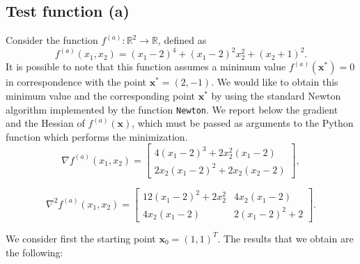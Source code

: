 \documentclass[a4paper,11pt]{article}
\newcommand{\R}{\mathbb{R}}
\begin{document}
	
	\subsection*{Test function (a)}
	Consider the function $f^{(a)}: \R^{2}\rightarrow \R$, defined as
	\begin{equation}
		f^{(a)}(x_{1},x_{2}) = (x_{1}-2)^{4} + (x_{1}-2)^{2}x_{2}^{2} + (x_{2}+1)^{2}.
	\end{equation}
	It is possible to note that this function assumes a minimum value $f^{(a)}(\textbf{x}^*)=0$ in correspondence with the point $\textbf{x}^*=(2,-1)$. We would like to obtain this minimum value and the corresponding point $\textbf{x}^*$ by using the standard Newton algorithm implemented by the function \texttt{Newton}. We report below the gradient and the Hessian of $f^{(a)}(\textbf{x})$, which must be passed as arguments to the Python function which performs the minimization.
	\begin{equation}
		\nabla f^{(a)}(x_{1},x_{2}) = \begin{bmatrix}
			4(x_{1}-2)^{3} + 2x_{2}^{2}(x_{1}-2)\\
			2x_{2}(x_{1}-2)^{2} + 2x_{2}(x_{2}-2)
		\end{bmatrix},
	\end{equation}

		\begin{equation}
		\nabla^{2} f^{(a)}(x_{1},x_{2}) = \begin{bmatrix}
			12(x_{1}-2)^{2} + 2x_{2}^{2} & 4x_{2}(x_{1}-2)\\
			4x_{2}(x_{1}-2) & 2(x_{1}-2)^{2} + 2
		\end{bmatrix}.
	\end{equation}
	
	\noindent We consider first the starting point $\textbf{x}_{0}=(1,1)^{T}$. The results that we obtain are the following:
	
\end{document}
